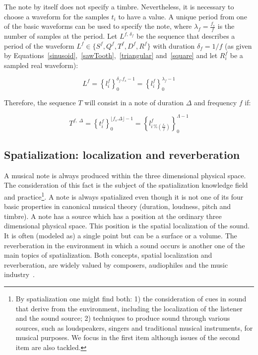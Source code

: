 The note by itself does not specify a timbre. Nevertheless, it is necessary to choose a waveform for the samples $t_i$ to have a value. A unique period from one of the basic waveforms can be used to specify the note, where $\lambda_f=\frac{f_s}{f}$ is the number of samples at the period. Let $L^{f,\, \delta_f} $ be the sequence that describes a period of the waveform $L^f \in \{S^f,Q^f,T^f,D^f,R^f \}$ with duration $\delta_f=1/f$ (as given by Equations~\ref{sinusoid},~\ref{sawTooth},~\ref{triangular} and~\ref{square} and let $R_i^f$ be a sampled real waveform):

\begin{equation}\label{periodoUnico}
L^{f} = \left\{ l_i^f \right\}_0^{\delta_f . f_s -1}=\left\{ l_i^f \right\}_0^{\lambda_f-1}
\end{equation}

Therefore, the sequence $T$ will consist in a note of duration $\Delta$ and frequency $f$ if:

\begin{equation}\label{eq:notaBasicaTimbre}
T^{f,\; \Delta}=\left\{t_i^f\right\}_0^{\lfloor f_s . \Delta \rfloor -1}=\left \{ l^f_{i\,\%\left(\frac{f_s}{f}\right)} \right \}_0^{\Lambda-1}
\end{equation}

\subsection{Spatialization: localization and reverberation}\label{subsec:spac}
A musical note is always produced within the three dimensional physical space.
The consideration of this fact is the subject of the spatialization knowledge field and practice\footnote{By
spatialization one might find both:
1) the consideration of cues in sound that derive from the environment,
including the localization of the listener and the sound source;
2) techniques to produce sound through various sources, such as loudspeakers, singers and traditional musical instruments, for musical purposes.
We focus in the first item although issues of the second item are also tackled.}.
A note is always spatialized
even though it is not one of its four basic properties in canonical musical theory (duration, loudness, pitch and timbre).
A note has a source which has a position at the ordinary three dimensional physical space.
This position is the spatial localization of the sound.
It is often (modeled as) a single point but can be a surface or a volume.
The reverberation in the environment in which a sound occurs is another one of the main topics of spatialization.
Both concepts, spatial localization and reverberation,
are widely valued by composers, audiophiles and the music industry~\cite{floEsp}.

